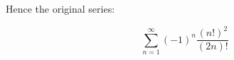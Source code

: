 \documentclass{ximera}
\begin{document}
\begin{exercise}
\begin{hint}
\begin{question}
\begin{question}
\begin{question}
Hence the original series:

\[
\sum^{\infty}_{n=1} (-1)^n \frac{(n!)^2}{(2n)!}
\]

 \begin{multipleChoice}
\end{multipleChoice}

\end{question}
\end{question}
\end{question}
\end{hint}

\end{exercise}
\end{document}
